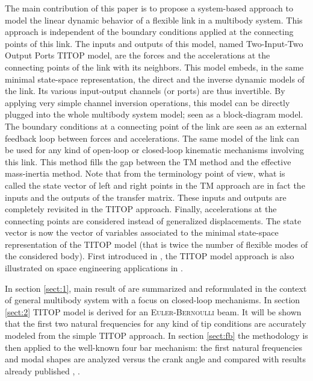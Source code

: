 \documentclass[smallcondensed]{svjour3}     %
\begin{document}
The main contribution of this paper is to propose a system-based approach to model the linear dynamic behavior of a flexible link in a multibody system. This approach is independent of the boundary conditions applied at the connecting points of this link. The inputs and outputs of this model, named Two-Input-Two Output Ports TITOP model, are the  forces and the accelerations at the connecting points of the link with its neighbors. This model embeds, in the same minimal state-space representation, the direct and the inverse dynamic models of the link. Its various input-output channels (or ports) are thus invertible. By applying very simple channel inversion operations, this model can be directly plugged into the whole multibody system model; seen as a block-diagram model. The boundary conditions at a connecting point of the link are seen as an external feedback loop between forces and accelerations. The same model of the link can be used for any kind of open-loop or closed-loop kinematic mechanisms involving this link. This method fills the gap between the TM method and the effective mass-inertia method. Note that from the terminology point of view, what is called the state vector of left and right points in the TM approach are in fact the inputs and the outputs of the transfer matrix. These inputs and outputs are completely revisited in the TITOP approach. Finally, accelerations at the connecting points are considered instead of generalized displacements. The state vector is now the vector of variables associated to the minimal state-space representation of the TITOP model (that is twice the number of flexible modes of the considered body). First introduced in \cite{Alazard2015}, the TITOP model approach is also illustrated on space engineering applications in \cite{Murali2015,Perez2015,PEREZ2015275,Perez2015_LM}.

In section \ref{sect:1}, main result of \cite{Alazard2015} are summarized and reformulated in the context of general multibody system with a focus on closed-loop mechanisms. In section \ref{sect:2} TITOP model is derived for an \textsc{Euler-Bernoulli} beam. It will be shown that the first two natural frequencies for any kind of tip conditions are accurately modeled from the simple TITOP approach. In section \ref{sect:fb} the methodology is then applied to the well-known four bar mechanism: the first natural frequencies and modal shapes are analyzed versus the crank angle and compared with results already published \cite{Kitis1990267}, \cite{Turcic1984}. 
\end{document}
